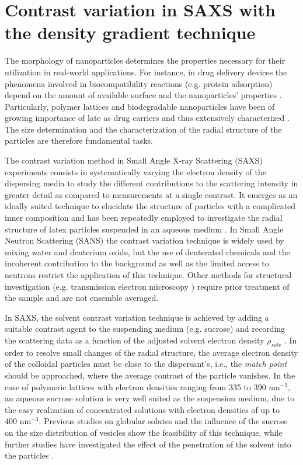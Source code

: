 \chapter{Contrast variation in SAXS with the density gradient technique}
\label{chap:density_gradient_SAXS}
The morphology of nanoparticles determines the properties necessary for their utilization in real-world applications. For instance, in drug delivery devices the phenomena involved in biocompatibility reactions (e.g. protein adsorption) depend on the amount of available surface and the nanoparticles' properties \citet{Vittaz1996}. Particularly, polymer lattices and biodegradable nanoparticles have been of growing importance of late as drug carriers \citet{Kattan1992} and thus extensively characterized \citet{Soppimath2001}. The size determination and the characterization of the radial structure of the particles are therefore fundamental tasks. 

The contrast variation method in Small Angle X-ray Scattering (SAXS) experiments consists in systematically varying the electron density of the dispersing media to study the different contributions to the scattering intensity in greater detail as compared to measurements at a single contrast. It emerges as an ideally suited technique to elucidate the structure of particles with a complicated inner composition and has been repeatedly employed to investigate the radial structure of latex particles suspended in an aqueous medium \citet{Dingenouts1999,Ballauff2011}. In Small Angle Neutron Scattering (SANS) the contrast variation technique is widely used by mixing water and deuterium oxide, but the use of deuterated chemicals and the incoherent contribution to the background as well as the limited access to neutrons restrict the application of this technique. Other methods for structural investigation (e.g. transmission electron microscopy \citet{Joensson1991,Silverstein1989}) require prior treatment of the sample and are not ensemble averaged. 

In SAXS, the solvent contrast variation technique is achieved by adding a suitable contrast agent to the suspending medium (e.g. sucrose) and recording the scattering data as a function of the adjusted solvent electron density \( \rho_{solv} \) \citet{Ballauff2001,Bolze2003}. In order to resolve small changes of the radial structure, the average electron density of the colloidal particles must be close to the dispersant's, i.e., the \emph{match point} should be approached, where the average contrast of the particle vanishes. In the case of polymeric lattices with electron densities ranging from 335 to \(390 \mbox{ nm}^{-3}\), an aqueous sucrose solution is very well suited as the suspension medium, due to the easy realization of concentrated solutions with electron densities of up to \(400 \mbox{ nm}^{-3}\). Previous studies on globular solutes \citet{Kawaguchi1992} and the influence of the sucrose on the size distribution of vesicles \citet{Kiselev2001} show the feasibility of this technique, while further studies have investigated the effect of the penetration of the solvent into the particles \citet{Kawaguchi1993}.

